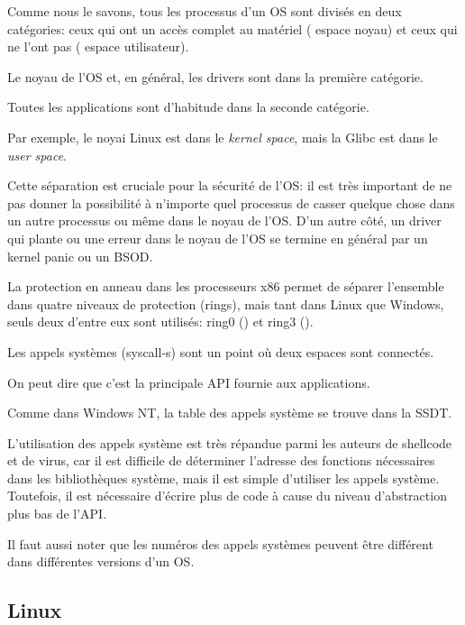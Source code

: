 ﻿

\label{syscalls}

Comme nous le savons, tous les processus d'un \ac{OS} sont divisés en deux catégories:
ceux qui ont un accès complet au matériel ( espace noyau)
et ceux qui ne l'ont pas ( espace utilisateur).

Le noyau de l'OS et, en général, les drivers sont dans la première catégorie.

Toutes les applications sont d'habitude dans la seconde catégorie.

Par exemple, le noyai Linux est dans le \emph{kernel space}, mais la Glibc est dans
le \emph{user space}.

Cette séparation est cruciale pour la sécurité de l'\ac{OS}: il est très important
de ne pas donner la possibilité à n'importe quel processus de casser quelque chose
dans un autre processus ou même dans le noyau de l'\ac{OS}.
D'un autre côté, un driver qui plante ou une erreur dans le noyau de l'\ac{OS} se
termine en général par un kernel panic ou un \ac{BSOD}.

La protection en anneau dans les processeurs x86 permet de séparer l'ensemble dans
quatre niveaux de protection (rings), mais tant dans Linux que Windows, seuls deux
d'entre eux sont utilisés: ring0 () et ring3 ().

Les appels systèmes (syscall-s) sont un point où deux espaces sont connectés.

On peut dire que c'est la principale \ac{API} fournie aux applications.

Comme dans \gls{Windows NT}, la table des appels système se trouve dans la \ac{SSDT}.


L'utilisation des appels système est très répandue parmi les auteurs de shellcode
et de virus, car il est difficile de déterminer l'adresse des fonctions nécessaires
dans les bibliothèques système, mais il est simple d'utiliser les appels système.
Toutefois, il est nécessaire d'écrire plus de code à cause du niveau d'abstraction
plus bas de l'\ac{API}.

Il faut aussi noter que les numéros des appels systèmes peuvent être différent dans
différentes versions d'un OS.

\subsection{Linux}
\label{linux_syscall}

